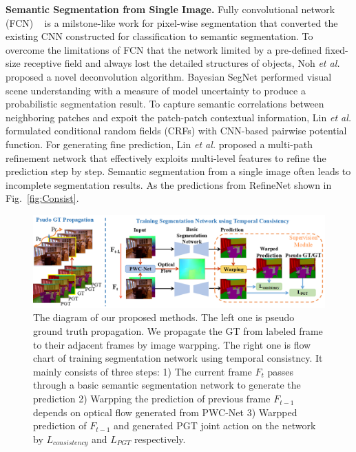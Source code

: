 {\bf Semantic Segmentation from Single Image.}
%
Fully convolutional network (FCN) ~\cite{Long2015} is a milstone-like work for pixel-wise segmentation that converted the existing CNN constructed for classification to semantic segmentation.
%
To overcome the limitations of FCN that the network limited by a pre-defined fixed-size receptive field and always lost the detailed structures of objects, Noh \emph{et al.} \cite{Noh2015} proposed a novel deconvolution algorithm. 
%
Bayesian SegNet \cite{Kendall2015} performed visual scene understanding with a measure of model uncertainty to produce a probabilistic segmentation result.
%
To capture semantic correlations between neighboring patches and expoit the
patch-patch contextual information, Lin \emph{et al.} \cite{Lin2016} formulated conditional random fields (CRFs) with CNN-based pairwise potential function. 
%
For generating fine prediction, Lin \emph{et al.} \cite{Lin2017} proposed a multi-path refinement network that effectively exploits multi-level features to refine the prediction step by step.
%
Semantic segmentation from a single image often leads to incomplete segmentation results. 
%
As the predictions from RefineNet \cite{Lin2017} shown in Fig.~\ref{fig:Consist}.

\begin{figure}[htbp]
	\vspace{-0.6cm}
	\setlength{\abovecaptionskip}{0pt} 
	\setlength{\belowcaptionskip}{10pt}
	\centering
	\centering
	\includegraphics[scale=0.57]{figure/Pipeline.png}
	\vspace*{-0.8cm} 
	\caption{The diagram of our proposed methods. The left one is pseudo ground truth propagation. We propagate the GT from labeled frame to their adjacent frames by image warpping. The right one is flow chart of training segmentation network using temporal consistncy. It mainly consists of three steps: 1) The current frame $F_t$ passes through a basic semantic segmentation network to generate the prediction  2) Warpping the prediction of previous frame $F_{t-1}$ depends on optical flow generated from PWC-Net \cite{Sun2018} 3) Warpped prediction of $F_{t-1}$ and generated PGT joint action on the network by $L_{consistency}$ and $L_{PGT}$ respectively.}
	\label{fig:Pipeline}
	\vspace*{-0.2cm}
\end{figure}

